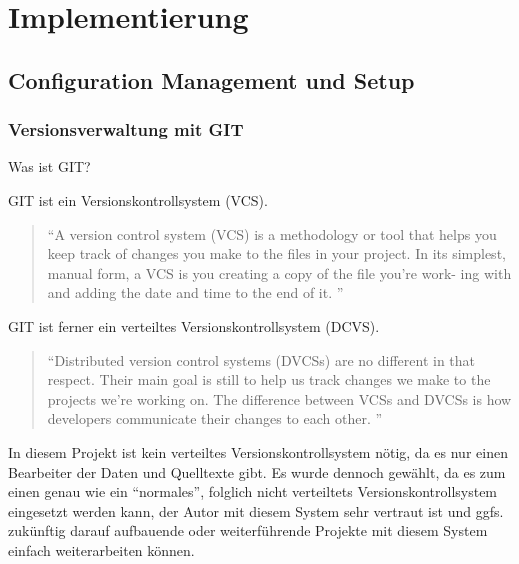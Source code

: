 \chapter{Implementierung} \label{kap:implementierung}

\section{Configuration Management und Setup}

\subsection{Versionsverwaltung mit GIT}

Was ist GIT?

GIT ist ein Versionskontrollsystem (VCS). 

\begin{quotation}
\enquote{A version control system (VCS) is a methodology or tool that helps you keep track of changes you make to the files in your project. In its simplest, manual form, a VCS is you creating a copy of the file you’re work- ing with and adding the date and time to the end of it. \citep[S. 15][]{pragGit}}
\end{quotation}

GIT ist ferner ein verteiltes Versionskontrollsystem (DCVS).

\begin{quotation}
\enquote{Distributed version control systems (DVCSs) are no different in that respect. Their main goal is still to help us track changes we make to the projects we’re working on. The difference between VCSs and DVCSs is how developers communicate their changes to each other. \citep[S. 15][]{pragGit}}
\end{quotation}

In diesem Projekt ist kein verteiltes Versionskontrollsystem nötig, da es nur einen Bearbeiter der Daten und Quelltexte gibt. Es wurde dennoch gewählt, da es zum einen genau wie ein \enquote{normales}, folglich nicht verteiltets Versionskontrollsystem eingesetzt werden kann, der Autor mit diesem System sehr vertraut ist und ggfs. zukünftig darauf aufbauende oder weiterführende Projekte mit diesem System einfach weiterarbeiten können. 

